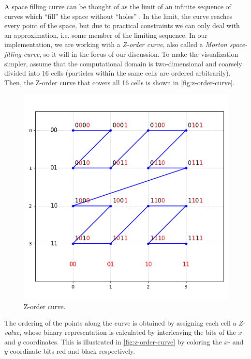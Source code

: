 A space filling curve can be thought of as the limit of an infinite sequence of curves which ``fill'' the space without ``holes'' \cite{WeissteinPlaneFilling}.
In the limit, the curve reaches every point of the space, but due to practical constraints we can only deal with an approximation, i.e. some member of the limiting sequence.
In our implementation, we are working with a \textit{Z-order curve}, also called a \textit{Morton space-filling curve}, so it will in the focus of our discussion.
To make the visualization simpler, assume that the computational domain is two-dimensional and coarsely divided into 16 cells (particles within the same cells are ordered arbitrarily).
Then, the Z-order curve that covers all 16 cells is shown in \autoref{fig:z-order-curve}.
\begin{figure}[htp]
    \centering
    \includegraphics[scale=0.5]{img/z-order.png}
    \caption{Z-order curve.}
    \label{fig:z-order-curve}
\end{figure}
The ordering of the points along the curve is obtained by assigning each cell a \textit{Z-value}, whose binary representation is calculated by interleaving the bits of the $x$ and $y$ coordinates.
This is illustrated in \autoref{fig:z-order-curve} by coloring the $x$- and $y$-coordinate bits red and black respectively.


